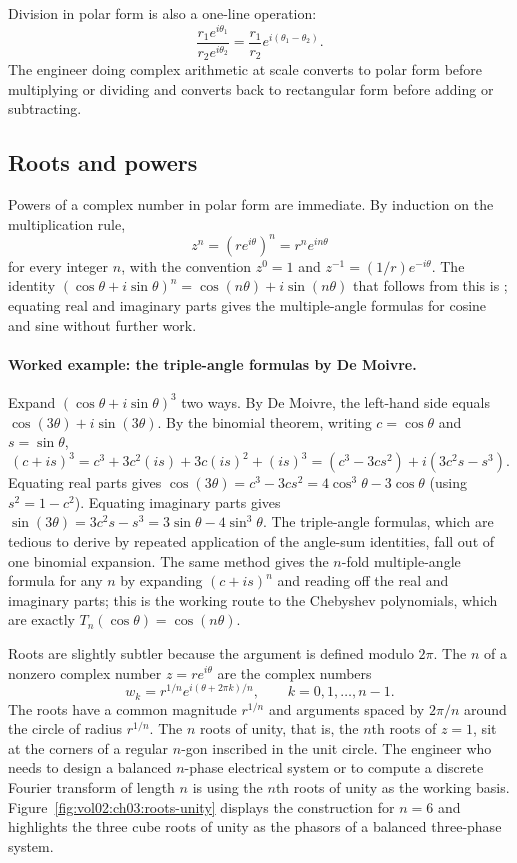 Division in polar form is also a one-line operation:
\[
\frac{r_{1} e^{i\theta_{1}}}{r_{2} e^{i\theta_{2}}} = \frac{r_{1}}{r_{2}} e^{i(\theta_{1} - \theta_{2})}.
\]
The engineer doing complex arithmetic at scale converts to polar
form before multiplying or dividing and converts back to
rectangular form before adding or subtracting.

\subsection{Roots and powers}

Powers of a complex number in polar form are immediate. By
induction on the multiplication rule,
\[
z^{n} = (r e^{i\theta})^{n} = r^{n} e^{in\theta}
\]
for every integer $n$, with the convention $z^{0} = 1$ and
$z^{-1} = (1/r) e^{-i\theta}$. The identity $(\cos\theta +
i\sin\theta)^{n} = \cos(n\theta) + i\sin(n\theta)$ that follows
from this is ; equating real and
imaginary parts gives the multiple-angle formulas for cosine and
sine without further work.

\paragraph{Worked example: the triple-angle formulas by De Moivre.}
Expand $(\cos\theta + i\sin\theta)^{3}$ two ways. By De Moivre, the
left-hand side equals $\cos(3\theta) + i\sin(3\theta)$. By the
binomial theorem, writing $c = \cos\theta$ and $s = \sin\theta$,
\[
(c + is)^{3} = c^{3} + 3c^{2}(is) + 3c(is)^{2} + (is)^{3}
= (c^{3} - 3cs^{2}) + i(3c^{2}s - s^{3}).
\]
Equating real parts gives $\cos(3\theta) = c^{3} - 3cs^{2} =
4\cos^{3}\theta - 3\cos\theta$ (using $s^{2} = 1 - c^{2}$). Equating
imaginary parts gives $\sin(3\theta) = 3c^{2}s - s^{3} = 3\sin\theta
- 4\sin^{3}\theta$. The triple-angle formulas, which are tedious to
derive by repeated application of the angle-sum identities, fall out
of one binomial expansion. The same method gives the $n$-fold
multiple-angle formula for any $n$ by expanding $(c + is)^{n}$ and
reading off the real and imaginary parts; this is the working route
to the Chebyshev polynomials, which are exactly $T_{n}(\cos\theta) =
\cos(n\theta)$.

Roots are slightly subtler because the argument is defined modulo
$2\pi$. The $n$  of a nonzero complex number
$z = r e^{i\theta}$ are the complex numbers
\[
w_{k} = r^{1/n} e^{i(\theta + 2\pi k)/n}, \qquad k = 0, 1, \ldots, n-1.
\]
The roots have a common magnitude $r^{1/n}$ and arguments spaced
by $2\pi/n$ around the circle of radius $r^{1/n}$. The $n$ roots
of unity, that is, the $n$th roots of $z = 1$, sit at the corners
of a regular $n$-gon inscribed in the unit circle. The engineer
who needs to design a balanced $n$-phase electrical system or to
compute a discrete Fourier transform of length $n$ is using the
$n$th roots of unity as the working basis.
Figure~\ref{fig:vol02:ch03:roots-unity} displays the construction
for $n = 6$ and highlights the three cube roots of unity as the
phasors of a balanced three-phase system.

